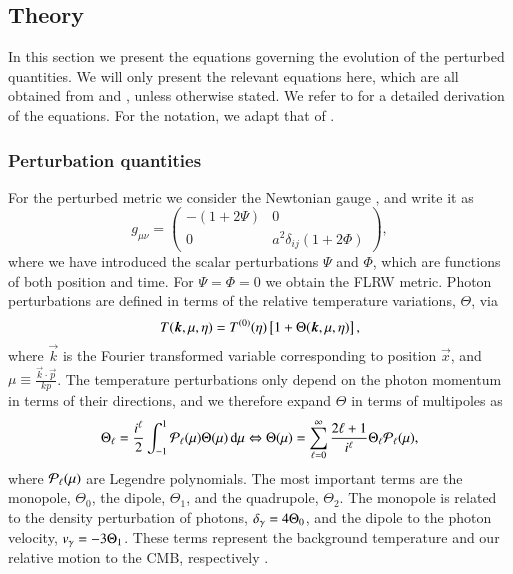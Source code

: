 \subsection{Theory}\label{ssec:M3:theory}
In this section we present the equations governing the evolution of the perturbed quantities. We will only present the relevant equations here, which are all obtained from \cite{Dodelson} and \cite{callin}, unless otherwise stated. We refer to \citeauthor{Dodelson} for a detailed derivation of the equations. For the notation, we adapt that of \citeauthor{callin}. 

\subsubsection{Perturbation quantities}\label{sssec:M3:theory:perturbations}
For the perturbed metric we consider the Newtonian gauge , and write it as  
\begin{equation} \label{eq:M3:theory:metric_perturbation}
    g_{\mu\nu} = 
    \begin{pmatrix}
        -(1+2\Psi) & 0 \\
        0 & a^2 \delta_{ij}(1+2\Phi)
    \end{pmatrix},
\end{equation}
where we have introduced the scalar perturbations $\Psi$ and $\Phi$, which are functions of both position and time. For $\Psi=\Phi=0$ we obtain the FLRW metric. Photon perturbations are defined in terms of the relative temperature variations, $\Theta$, via 
\begin{equation} \label{eq:M3:theory:temperature_fluctuations}
    T(\boldsymbol{k},\mu,\eta) = T^{(0)}(\eta)\left[ 1 + \Theta(\boldsymbol{k},\mu,\eta) \right],
\end{equation}  
where $\vec{k}$ is the Fourier transformed variable corresponding to position $\vec{x}$, and $\mu\equiv \frac{\vec{k}\cdot\vec{p}}{kp}$. The temperature perturbations only depend on the photon momentum in terms of their directions, and we therefore expand $\Theta$ in terms of multipoles as 
\begin{equation} \label{eq:M3:theory:theta_ell_multipolse_expansion}
    \Theta_\ell = \frac{i^\ell}{2}\int_{-1}^1 \mathcal{P}_\ell(\mu)\Theta(\mu)\,\dd\mu \Leftrightarrow \Theta(\mu) = \sum_{\ell=0}^{\infty}\frac{2\ell+1}{i^\ell}\Theta_\ell \mathcal{P}_\ell(\mu),
\end{equation}
where $\mathcal{P}_\ell(\mu)$ are Legendre polynomials. The most important terms are the monopole, $\Theta_0$, the dipole, $\Theta_1$, and the quadrupole, $\Theta_2$. The monopole is related to the density perturbation of photons, $\delta_\gamma=4\Theta_0$, and the dipole to the photon velocity, $v_\gamma=-3\Theta_1$. These terms represent the background temperature and our relative motion to the CMB, respectively .  

